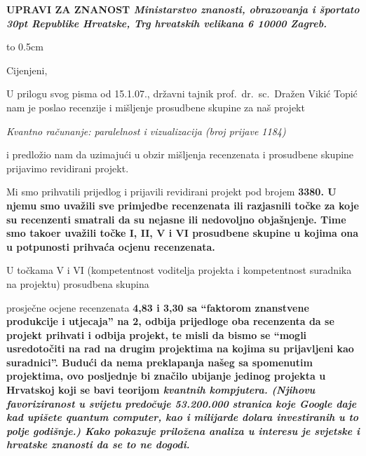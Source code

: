
\address
\parindent=20pt

\bf UPRAVI ZA ZNANOST 
\smallskip
\it Ministarstvo znanosti, obrazovanja i \v sporta\break\hbox to 30pt{\hfill} Republike Hrvatske, 
\rm Trg hrvatskih velikana 6 
10000 Zagreb.

\endaddress

\vbox to 0.5cm{\vfill}


\parindent=0pt    


\bigskip\medskip
Cijenjeni, 

\medskip

U prilogu svog pisma od 15.1.07., dr\v zavni tajnik prof.~dr.~sc.~Dra\v zen 
Viki\'c Topi\'c nam je poslao recenzije i mi\v sljenje 
prosudbene skupine za na\v s projekt

\it
\parindent=40pt   
Kvantno ra\v cunanje: paralelnost i vizualizacija (broj prijave 1184)
\rm

\parindent=0pt   
i predlo\v zio nam da uzimaju\'ci u obzir mi\v sljenja recenzenata
i prosudbene skupine prijavimo revidirani projekt.  

\smallskip
\parindent=20pt   
Mi smo prihvatili prijedlog i prijavili revidirani projekt pod 
brojem \bf 3380\rm. U njemu smo uva\v zili sve 
primjedbe recenzenata ili razjasnili to\v cke za koje su recenzenti 
smatrali da su nejasne ili nedovoljno obja\v snjenje. Time smo tako\dj er 
uva\v zili to\v cke I, II, V i VI prosudbene skupine u kojima ona 
u potpunosti prihva\'ca ocjenu recenzenata. 

\smallskip 
U to\v ckama V i VI (kompetentnost voditelja projekta i 
kompetentnost suradnika na projektu) prosudbena  skupina 
 \rm prosje\v cne ocjene 
recenzenata \bf 4,83 \rm i \bf 3,30 \rm sa \bf ``faktorom znanstvene 
produkcije i utjecaja'' \rm na \bf 2\rm, \bf odbija 
\rm prijedloge \bf oba recenzenta da se projekt prihvati \rm i 
\bf odbija \rm projekt, te misli da bismo se ``mogli usredoto\v citi na 
rad na drugim  projektima na kojima su prijavljeni kao suradnici''. 
Budu\'ci da nema preklapanja na\v seg sa spomenutim projektima, ovo
posljednje bi zna\v cilo ubijanje jedinog projekta u Hrvatskoj \rm 
koji se bavi teorijom \it kvantnih kompjutera\rm. (Njihovu favoriziranost 
u svijetu predo\v cuje \bf 53.200.000 \rm stranica koje \it Google \rm daje kad 
upi\v sete \it quantum computer\rm, kao i \bf milijarde dolara \rm investiranih 
u to polje godi\v snje.) Kako pokazuje prilo\v zena analiza u interesu 
je svjetske i hrvatske znanosti da se to ne dogodi. 

